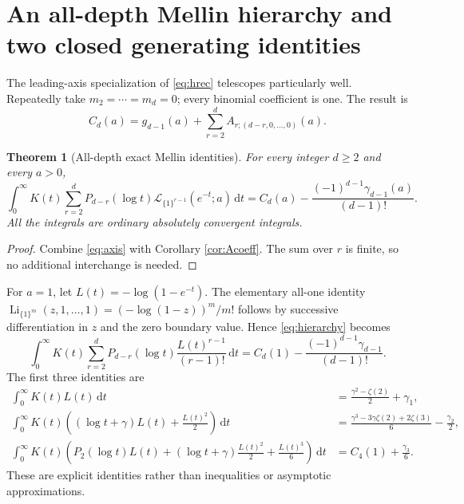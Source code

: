 \documentclass[11pt,a4paper]{article}
\numberwithin{equation}{section}
\newtheorem{theorem}{Theorem}[section]
\theoremstyle{definition}\newtheorem{definition}[theorem]{Definition}
\theoremstyle{remark}\newtheorem{remark}[theorem]{Remark}
\DeclareMathOperator{\Li}{Li}
\newcommand{\LL}{\mathcal L}
\newcommand{\dd}{\,\mathrm d}
\begin{document}
\section{An all-depth Mellin hierarchy and two closed generating identities}
\label{sec:master}

The leading-axis specialization of \eqref{eq:hrec} telescopes particularly
well. Repeatedly take $m_2=\cdots=m_d=0$; every binomial coefficient is
one. The result is
\begin{equation}\label{eq:axis}
 C_d(a)=g_{d-1}(a)+\sum_{r=2}^{d}A_{r;(d-r,0,\ldots,0)}(a).
\end{equation}

\begin{theorem}[All-depth exact Mellin identities]\label{thm:hierarchy}
For every integer $d\ge2$ and every $a>0$,
\begin{equation}\label{eq:hierarchy}
 \boxed{\displaystyle
 \int_0^\infty K(t)\sum_{r=2}^{d}P_{d-r}(\log t)
          \LL_{\{1\}^{r-1}}(e^{-t};a)\dd t
   =C_d(a)-\frac{(-1)^{d-1}\gamma_{d-1}(a)}{(d-1)!}.}
\end{equation}
All the integrals are ordinary absolutely convergent integrals.
\end{theorem}
\begin{proof}
Combine \eqref{eq:axis} with Corollary \ref{cor:Acoeff}. The sum over
$r$ is finite, so no additional interchange is needed.
\end{proof}

For $a=1$, let $L(t)=-\log(1-e^{-t})$. The elementary all-one identity
$\Li_{\{1\}^{m}}(z,1,\ldots,1)=(-\log(1-z))^m/m!$ follows by
successive differentiation in $z$ and the zero boundary value. Hence
\eqref{eq:hierarchy} becomes
\begin{equation}\label{eq:elementaryhierarchy}
 \int_0^\infty K(t)\sum_{r=2}^{d}
    P_{d-r}(\log t)\frac{L(t)^{r-1}}{(r-1)!}\dd t
 =C_d(1)-\frac{(-1)^{d-1}\gamma_{d-1}}{(d-1)!}.
\end{equation}
The first three identities are
\begin{align}
 \int_0^\infty K(t)L(t)\dd t
     &=\frac{\gamma^2-\zeta(2)}2+\gamma_1,\label{eq:I2}\\
 \int_0^\infty K(t)\left((\log t+\gamma)L(t)+\frac{L(t)^2}2\right)\dd t
     &=\frac{\gamma^3-3\gamma\zeta(2)+2\zeta(3)}6-\frac{\gamma_2}2,
       \label{eq:I3}\\
 \int_0^\infty K(t)\left(P_2(\log t)L(t)
        +(\log t+\gamma)\frac{L(t)^2}2+\frac{L(t)^3}6\right)\dd t
     &=C_4(1)+\frac{\gamma_3}6.\label{eq:I4}
\end{align}
These are explicit identities rather than inequalities or asymptotic
approximations.
\end{document}
